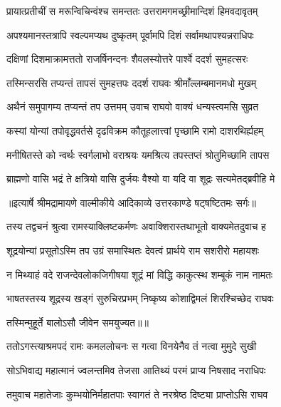 \twolineshloka
{प्रायात्प्रतीचीं स मरून्विचिन्वंश्च समन्ततः}
{उत्तरामगमच्छ्रीमान्दिशं हिमवदावृतम्} %

\twolineshloka
{अपश्यमानस्तत्रापि स्वल्पमप्यथ दुष्कृतम्}
{पूर्वामपि दिशं सर्वामथापश्यन्नराधिपः} %

\twolineshloka
{दक्षिणां दिशमाक्रामत्ततो राजर्षिनन्दनः}
{शैवलस्योत्तरे पार्श्वे ददर्श सुमहत्सरः} %

\twolineshloka
{तस्मिन्सरसि तप्यन्तं तापसं सुमहत्तपः}
{ददर्श राघवः श्रीमाँल्लम्बमानमधो मुखम्} %

\twolineshloka
{अथैनं समुपागम्य तप्यन्तं तप उत्तमम्}
{उवाच राघवो वाक्यं धन्यस्त्वमसि सुव्रत} %

\twolineshloka
{कस्यां योन्यां तपोवृद्धवर्तसे दृढविक्रम}
{कौतूहलात्त्वां पृच्छामि रामो दाशरथिर्ह्यहम्} %

\twolineshloka
{मनीषितस्ते को न्वर्थः स्वर्गलाभो वराश्रयः}
{यमश्रित्य तपस्तप्तं श्रोतुमिच्छामि तापस} %

\twolineshloka
{ब्राह्मणो वासि भद्रं ते क्षत्रियो वासि दुर्जयः}
{वैश्यो वा यदि वा शूद्रः सत्यमेतद्ब्रवीहि मे} %


{॥इत्यार्षे श्रीमद्रामायणे वाल्मीकीये आदिकाव्ये उत्तरकाण्डे षट्षष्टितमः सर्गः॥}


\twolineshloka
{तस्य तद्वचनं श्रुत्वा रामस्याक्लिष्टकर्मणः}
{अवाक्शिरास्तथाभूतो वाक्यमेतदुवाच ह} %

\twolineshloka
{शूद्रयोन्यां प्रसूतोऽस्मि तप उग्रं समास्थितः}
{देवत्वं प्रार्थये राम सशरीरो महायशः} %

\twolineshloka
{न मिथ्याहं वदे राजन्देवलोकजिगीषया}
{शूद्रं मां विद्धि काकुत्स्थ शम्बूकं नाम नामतः} %

\twolineshloka
{भाषतस्तस्य शूद्रस्य खड्गं सुरुचिरप्रभम्}
{निष्कृष्य कोशाद्विमलं शिरश्चिच्छेद राघवः} %

{तस्मिन्मुहूर्ते बालोऽसौ जीवेन समयुज्यत॥॥} %

\addtocounter{shlokacount}{1}

\twolineshloka
{ततोऽगस्त्याश्रमपदं रामः कमललोचनः}
{स गत्वा विनयेनैव तं नत्वा मुमुदे सुखी} %

\twolineshloka
{सोऽभिवाद्य महात्मानं ज्वलन्तमिव तेजसा}
{आतिथ्यं परमं प्राप्य निषसाद नराधिपः} %

\twolineshloka
{तमुवाच महातेजाः कुम्भयोनिर्महातपाः}
{स्वागतं ते नरश्रेष्ठ दिष्ट्या प्राप्तोऽसि राघव} %

